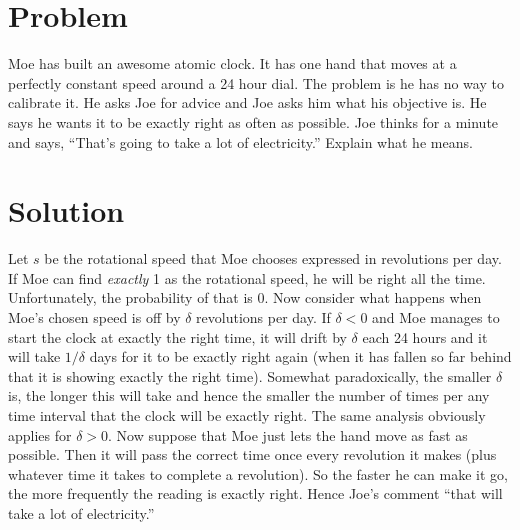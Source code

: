 \documentclass[11pt,a4paper]{report}
\theoremstyle{plain}
\theoremstyle{definition}
\theoremstyle{remark}
\begin{document}
\section*{Problem} Moe has built an awesome atomic clock.  It has one hand that
moves at a perfectly constant speed around a 24 hour dial. The problem is he has
no way to calibrate it.  He asks Joe for advice and Joe asks him what his
objective is.  He says he wants it to be exactly right as often as possible.
Joe thinks for a minute and says, ``That’s going to take a lot of electricity.''
Explain what he means.

\section*{Solution} Let $s$ be the rotational speed that Moe chooses expressed
in revolutions per day. If Moe can find \emph{exactly} 1 as the rotational
speed, he will be right all the time.  Unfortunately, the probability of that is
$0$. Now consider what happens when Moe's chosen speed is off by $\delta$
revolutions per day.  If $\delta < 0$ and Moe manages to start the clock at
exactly the right time, it will drift by $\delta$ each 24 hours and it will take
$1/\delta$ days for it to be exactly right again (when it has fallen so far
behind that it is showing exactly the right time). Somewhat paradoxically, the
smaller $\delta$ is, the longer this will take and hence the smaller the number
of times per any time interval that the clock will be exactly right. The same
analysis obviously applies for $\delta > 0$. Now suppose that Moe just lets the
hand move as fast as possible. Then it will pass the correct time once every
revolution it makes (plus whatever time it takes to complete a revolution). So
the faster he can make it go, the more frequently the reading is exactly right.
Hence Joe's comment ``that will take a lot of electricity.'' 
\end{document}
